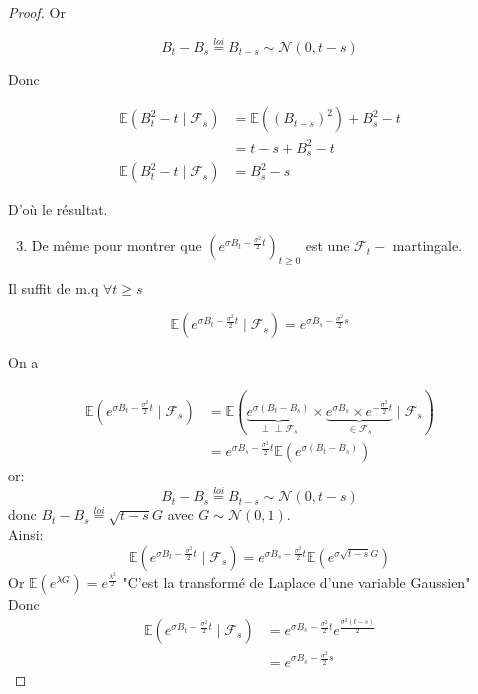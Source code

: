 \documentclass[A4paper,12pt]{report}
\def\Perp{\perp\!\!\!\perp}
\begin{document}
\begin{proof}
$\mathrm{Or}$

$$
B_{t}-B_{s} \stackrel{l o i}{=} B_{t-s} \sim \mathcal{N}(0, t-s)
$$

Donc

$$
\begin{aligned}
\mathbb{E}\left(B_{t}^{2}-t \mid \mathcal{F}_{s}\right) & =\mathbb{E}\left(\left(B_{t-s}\right)^{2}\right)+B_{s}^{2}-t \\
& =t-s+B_{s}^{2}-t \\
\mathbb{E}\left(B_{t}^{2}-t \mid \mathcal{F}_{s}\right) & =B_{s}^{2}-s
\end{aligned}
$$

D'où le résultat.\\
\begin{enumerate}
  \setcounter{enumi}{2}
  \item De même pour montrer que $\left(e^{\sigma B_{t}-\frac{\sigma^{2}}{2} t}\right)_{t \geq 0}$ est une $\mathcal{F}_{t}-$ martingale.
\end{enumerate}

Il suffit de m.q $\forall t \geq s$

$$
\mathbb{E}\left(e^{\sigma B_{t}-\frac{\sigma^{2}}{2} t} \mid \mathcal{F}_{s}\right)= e^{\sigma B_{s}-\frac{\sigma^{2}}{2} s}
$$

On a

$$
\begin{aligned}
\mathbb{E}\left(e^{\sigma B_{t}-\frac{\sigma^{2}}{2} t} \mid \mathcal{F}_{s}\right) & =\mathbb{E}(\underbrace{e^{\sigma\left(B_{t}-B_{s}\right)}}_{\Perp \mathcal{F}_{s}} \times \underbrace{e^{\sigma B_{s}} \times e^{-\frac{\sigma^{2}}{2} t}}_{\in \mathcal{F}_s} \mid \mathcal{F}_{s}) \\
& =e^{\sigma B_{s}-\frac{\sigma^{2}}{2} t} \mathbb{E}\left(e^{\sigma\left(B_{t}-B_{s}\right)}\right)
\end{aligned}
$$
or: $$B_{t}-B_{s} \stackrel{l o i}{=} B_{t-s} \sim \mathcal{N}(0, t-s)$$
donc $B_{t}-B_{s}\stackrel{l o i}{=} \sqrt{t-s}G$ avec $G \sim \mathcal{N}(0, 1)$. \\
Ainsi: $$\mathbb{E}\left(e^{\sigma B_{t}-\frac{\sigma^{2}}{2} t} \mid \mathcal{F}_{s}\right) = e^{\sigma B_{s}-\frac{\sigma^{2}}{2} t} \mathbb{E}\left(e^{\sigma \sqrt{t-s}G}\right) $$
Or $\mathbb{E}(e^{\lambda G}) = e^{\frac{\lambda^2}{2}}$ "C'est la transformé de Laplace d'une variable Gaussien"\\
Donc 
\begin{align*}
\mathbb{E}\left(e^{\sigma B_{t}-\frac{\sigma^{2}}{2} t} \mid \mathcal{F}_{s}\right)&=e^{\sigma B_{s}-\frac{\sigma^{2}}{2} t} e^{\frac{\sigma^{2}(t-s)}{2}}\\
&=e^{\sigma B_{s}-\frac{\sigma^{2}}{2} s}
\end{align*}
 
\end{proof}
\end{document}
